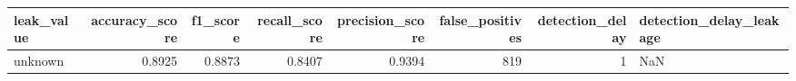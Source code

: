\begin{tabular}{lrrrrrrl}
\toprule
leak\_value & accuracy\_score & f1\_score & recall\_score & precision\_score & false\_positives & detection\_delay & detection\_delay\_leakage \\
\midrule
unknown & 0.8925 & 0.8873 & 0.8407 & 0.9394 & 819 & 1 & NaN \\
\bottomrule
\end{tabular}
